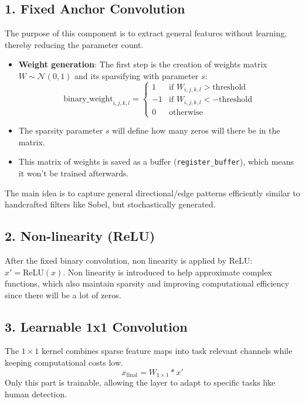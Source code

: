 \subsection*{1. Fixed Anchor Convolution}
The purpose of this component is to extract general features without learning, thereby reducing the parameter count. 
\begin{itemize}
    \item \textbf{Weight generation}: The first step is the creation of weights matrix $W \sim \mathcal{N}(0, 1)$ and its sparsifying with parameter $s$:
    \[ \text{binary\_weight}_{i,j,k,l} = \begin{cases} 1 & \text{if } W_{i,j,k,l} > \text{threshold} \\ -1 & \text{if } W_{i,j,k,l} < -\text{threshold} \\ 0 & \text{otherwise} \end{cases} \]
    \item The sparsity parameter $s$ will define how many zeros will there be in the matrix.
    \item This matrix of weights is saved as a buffer (\texttt{register\_buffer}), which means it won't be trained afterwards.
\end{itemize}
The main idea is to capture general directional/edge patterns efficiently similar to handcrafted filters like Sobel, but stochastically generated.

\subsection*{2. Non-linearity (ReLU)}
After the fixed binary convolution, non linearity is applied by ReLU: $x' = \text{ReLU}(x)$. Non linearity is introduced to help approximate complex functions, which also maintain sparsity and improving computational efficiency since there will be a lot of zeros. 
\subsection*{3. Learnable 1x1 Convolution}
The $1\times1$ kernel combines sparse feature maps into task relevant channels while keeping computational costs low. 
\begin{equation}
    x_{\text{final}} = W_{1\times1} * x'
\end{equation}
Only this part is trainable, allowing the layer to adapt to specific tasks like human detection.
